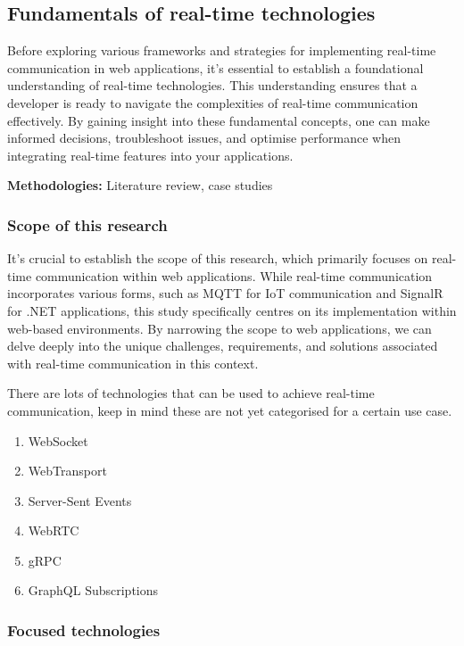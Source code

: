 \subsection{Fundamentals of real-time technologies}

Before exploring various frameworks and strategies for implementing real-time communication in web applications, it's essential to establish a foundational understanding of real-time technologies. This understanding ensures that a developer is ready to navigate the complexities of real-time communication effectively. By gaining insight into these fundamental concepts, one can make informed decisions, troubleshoot issues, and optimise performance when integrating real-time features into your applications.

\textbf{Methodologies:} Literature review, case studies

\subsubsection{Scope of this research}

It's crucial to establish the scope of this research, which primarily focuses on real-time communication within web applications. While real-time communication incorporates various forms, such as MQTT for IoT communication and SignalR for .NET applications, this study specifically centres on its implementation within web-based environments. By narrowing the scope to web applications, we can delve deeply into the unique challenges, requirements, and solutions associated with real-time communication in this context.

There are lots of technologies \cite{alby-ws-alt} that can be used to achieve real-time communication, keep in mind these are not yet categorised for a certain use case.

\begin{enumerate}
  \item WebSocket
  \item WebTransport
  \item Server-Sent Events
  \item WebRTC
  \item gRPC
  \item GraphQL Subscriptions
\end{enumerate}

\pagebreak

\subsubsection{Focused technologies}

